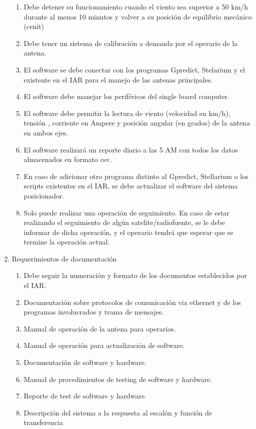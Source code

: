 \documentclass[11pt, %
codirector, %
]{charter}
\begin{document}
\begin{enumerate}
\begin{enumerate}
			\item Debe detener su funcionamiento cuando el viento sea superior a 50 km/h durante al menos 10 minutos y volver a su posición de equilibrio mecánico (cenit) 
			\item Debe tener un sistema de calibración a demanda por el operario de la antena. 
			\item El software se debe conectar con los programas Gpredict, Stelarium y el existente en el IAR para el manejo de las antenas principales. 
			\item El software debe manejar los periféricos del single board computer. 
			\item El software debe permitir la lectura de viento (velocidad en km/h), tensión , corriente en Ampere y posición angular (en grados) de la antena en ambos ejes. 
			\item El software realizará un reporte diario a las 5 AM con todos los datos almacenados en formato csv.  
			\item En caso de adicionar otro programa distinto al Gpredict, Stellarium o los scripts existentes en el IAR, se debe actualizar el software del sistema posicionador. 
			\item Solo puede realizar una operación de seguimiento. En caso de estar realizando el seguimiento de algún satelite/radiofuente, se le debe informar de dicha operación, y el operario tendrá que esperar que se termine la operación actual.  
		\end{enumerate}
	\item Requerimientos de documentación
		\begin{enumerate}
			\item Debe seguir la numeración y formato de los documentos establecidos por el IAR. 
			\item Documentación sobre protocolos de comunicación via ethernet y de los programas involucrados y trama de mensajes.
			\item Manual de operación de la antena para operarios. 
			\item Manual de operación para actualización de software. 
			\item Documentación de software y hardware. 
			\item Manual de procedimientos de testing de software y hardware.	
			\item Reporte de test de software y hardware. 
			\item Descripción del sistema a la respuesta al escalón y función de transferencia
	\end{enumerate}

\end{enumerate}
\end{document}
